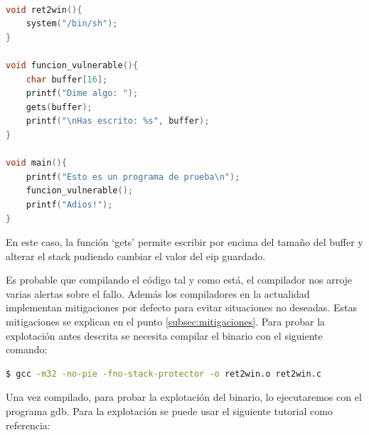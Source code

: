 \begin{lstlisting}[language=C, caption=Código vulnerable con función ret2win, label=snippet:simplebof]

void ret2win(){
    system("/bin/sh");
}

void funcion_vulnerable(){
    char buffer[16];
    printf("Dime algo: ");
    gets(buffer);
    printf("\nHas escrito: %s", buffer);
}

void main(){
    printf("Esto es un programa de prueba\n");
    funcion_vulnerable();
    printf("Adios!");
}
\end{lstlisting}
\FloatBarrier
En este caso, la función `gets' permite escribir por encima del tamaño del buffer y alterar el stack pudiendo cambiar el valor del \acrshort{eip} guardado.

Es probable que compilando el código tal y como está, el compilador nos arroje varias alertas sobre el fallo. Además los compiladores en la actualidad implementan mitigaciones por defecto para evitar situaciones no deseadas.
Estas mitigaciones se explican en el punto \ref{subsec:mitigaciones}.
Para probar la explotación antes descrita se necesita compilar el binario con el siguiente comando:
\begin{lstlisting}[language=bash, caption=Compilado de código con pocas mitigaciones y arquitectura 32bit]
$ gcc -m32 -no-pie -fno-stack-protector -o ret2win.o ret2win.c
\end{lstlisting}
Una vez compilado, para probar la explotación del binario, lo ejecutaremos con el programa \acrfull{gdb}.
Para la explotación se puede usar el siguiente tutorial como referencia:

